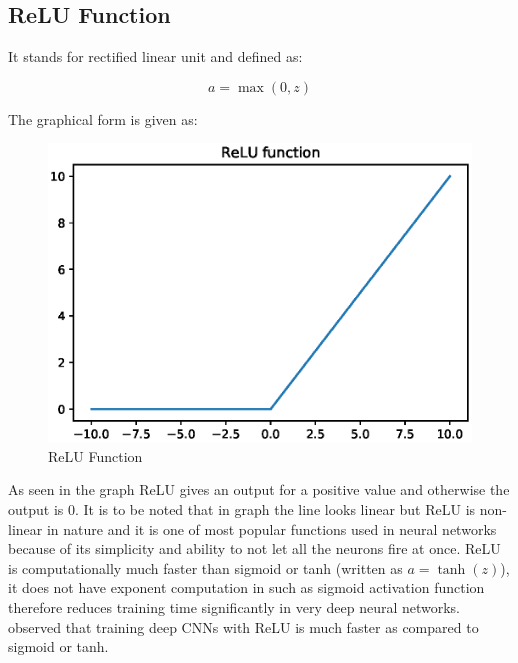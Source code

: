 \documentclass[11pt]{article}
\begin{document}
\subsection{ReLU Function}
It stands for rectified linear unit and defined as:

\begin{equation}
a = \max (0, z)
\end{equation}

The graphical form is given as:

\begin{figure}[H]
	\includegraphics[width=\linewidth]{files/cnn_architecture/relu.eps}
	\caption{ReLU Function}
	\label{fig: relu}
\end{figure}

As seen in the graph ReLU gives an output for a positive value and otherwise the output is 0. It is to be noted that in graph the line looks linear but ReLU is non-linear in nature and it is one of most popular functions used in neural networks because of its simplicity and ability to not let all the neurons fire at once. ReLU is computationally much faster than sigmoid or tanh (written as $a=\tanh (z)$), it does not have exponent computation in such as sigmoid activation function therefore reduces training time significantly in very deep neural networks. \cite{krizhevsky_imagenet_2012} observed that training deep CNNs with ReLU is much faster as compared to sigmoid or tanh. 
\end{document}
